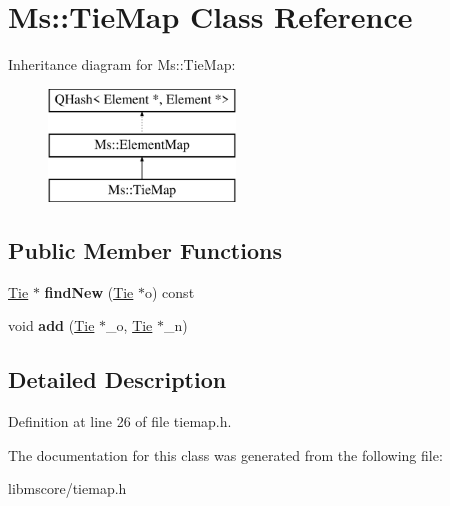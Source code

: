 \hypertarget{class_ms_1_1_tie_map}{}\section{Ms\+:\+:Tie\+Map Class Reference}
\label{class_ms_1_1_tie_map}
Inheritance diagram for Ms\+:\+:Tie\+Map\+:\begin{figure}[H]
\begin{center}
\leavevmode
\includegraphics[height=3.000000cm]{class_ms_1_1_tie_map}
\end{center}
\end{figure}
\subsection*{Public Member Functions}
\begin{DoxyCompactItemize}
\item 
\mbox{\label{class_ms_1_1_tie_map_af6885f2ffc22be936e08cfa227c61bb5}} 
\hyperlink{class_ms_1_1_tie}{Tie} $\ast$ {\bfseries find\+New} (\hyperlink{class_ms_1_1_tie}{Tie} $\ast$o) const
\item 
\mbox{\label{class_ms_1_1_tie_map_a6d893d4fb0a23fc3776ba830cb8a93b9}} 
void {\bfseries add} (\hyperlink{class_ms_1_1_tie}{Tie} $\ast$\+\_\+o, \hyperlink{class_ms_1_1_tie}{Tie} $\ast$\+\_\+n)
\end{DoxyCompactItemize}


\subsection{Detailed Description}


Definition at line 26 of file tiemap.\+h.



The documentation for this class was generated from the following file\+:\begin{DoxyCompactItemize}
\item 
libmscore/tiemap.\+h\end{DoxyCompactItemize}
